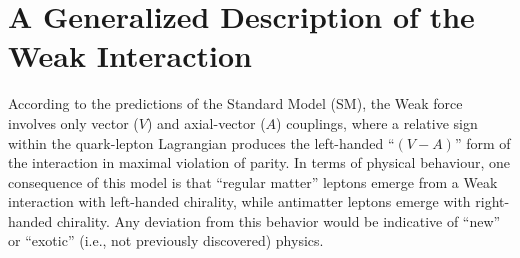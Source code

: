 


%
%
%
%
%
%
%
\section{A Generalized Description of the Weak Interaction}

According to the predictions of the Standard Model (SM), the Weak force involves only vector ($V$) and axial-vector ($A$) couplings, where a relative sign within the quark-lepton Lagrangian produces the left-handed ``$(V-A)$'' form of the interaction in maximal violation of parity.  In terms of physical behaviour, one consequence of this model is that ``regular matter'' leptons emerge from a Weak interaction with left-handed chirality, while antimatter leptons emerge with right-handed chirality. Any deviation from this behavior would be indicative of ``new'' or ``exotic'' (i.e., not previously discovered) physics.  


